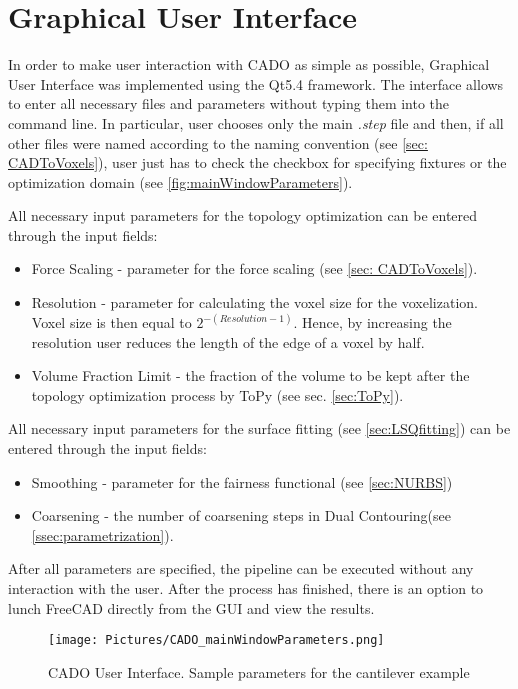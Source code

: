 \section{Graphical User Interface}
\label{sec:gui}
In order to make user interaction with CADO as simple as possible, Graphical User Interface was implemented using the Qt5.4 \cite{Qt} framework. 
The interface allows to enter all necessary files and parameters without typing them into the command line. In particular, user chooses only the main \textit{.step} file and then, if all other files were named according to the naming convention (see \autoref{sec: CADToVoxels}), user just has to check the checkbox for specifying fixtures or the optimization domain (see \autoref{fig:mainWindowParameters}).

All necessary input parameters for the topology optimization can be entered through the input fields:
\begin{itemize}
\item Force Scaling - parameter for the force scaling (see \autoref{sec: CADToVoxels}).
\item Resolution - parameter for calculating the voxel size for the voxelization. Voxel size is then equal to $2^{-(Resolution - 1)}$. Hence, by increasing the resolution user reduces the length of the edge of a voxel by half.
\item Volume Fraction Limit - the fraction of the volume to be kept after the topology optimization process by ToPy (see sec. \ref{sec:ToPy}).

\end{itemize}
All necessary input parameters for the surface fitting (see \autoref{sec:LSQfitting}) can be entered through the input fields:
\begin{itemize}
\item Smoothing - parameter for the fairness functional (see \autoref{sec:NURBS})
\item Coarsening - the number of coarsening steps in Dual Contouring(see \autoref{ssec:parametrization}).
\end{itemize}

After all parameters are specified, the pipeline can  be executed without any interaction with the user. After the process has finished, there is an option to lunch FreeCAD directly from the GUI  and view the results.

\begin{figure}[h]
\centering
\texttt{[image: Pictures/CADO\_mainWindowParameters.png]}
\caption{CADO User Interface. Sample parameters for the cantilever example}
\label{fig:mainWindowParameters}
\end{figure}


